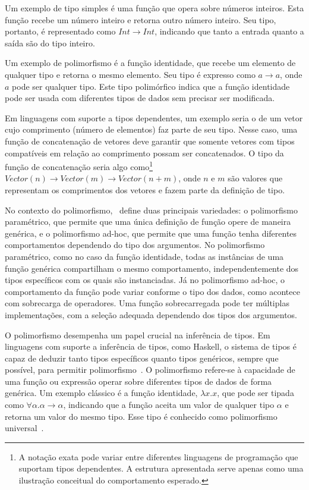 Um exemplo de tipo simples é uma função que opera sobre números inteiros.
Esta função recebe um número inteiro e retorna outro número inteiro.
Seu tipo, portanto, é representado como $Int \rightarrow Int$, indicando que tanto a entrada quanto a saída são do tipo inteiro.

Um exemplo de polimorfismo é a função identidade, que recebe um elemento de qualquer tipo e retorna o mesmo elemento.
Seu tipo é expresso como $a \rightarrow a$, onde $a$ pode ser qualquer tipo.
Este tipo polimórfico indica que a função identidade pode ser usada com diferentes tipos de dados sem precisar ser modificada.

Em linguagens com suporte a tipos dependentes, um exemplo seria o de um vetor cujo comprimento (número de elementos) faz parte de seu tipo.
Nesse caso, uma função de concatenação de vetores deve garantir que somente vetores com tipos compatíveis em relação ao comprimento possam ser concatenados.
O tipo da função de concatenação seria algo como\footnote{A notação exata pode variar entre diferentes linguagens de programação que suportam tipos dependentes. A estrutura apresentada serve apenas como uma ilustração conceitual do comportamento esperado.} $Vector(n) \rightarrow Vector(m) \rightarrow Vector(n+m)$, onde $n$ e $m$ são valores que representam os comprimentos dos vetores e fazem parte da definição de tipo.

No contexto do polimorfismo,~ define duas principais variedades: o polimorfismo paramétrico, que permite que uma única definição de função opere de maneira genérica, e o polimorfismo ad-hoc, que permite que uma função tenha diferentes comportamentos dependendo do tipo dos argumentos.
No polimorfismo paramétrico, como no caso da função identidade, todas as instâncias de uma função genérica compartilham o mesmo comportamento, independentemente dos tipos específicos com os quais são instanciadas.
Já no polimorfismo ad-hoc, o comportamento da função pode variar conforme o tipo dos dados, como acontece com sobrecarga de operadores. Uma função sobrecarregada pode ter múltiplas implementações, com a seleção adequada dependendo dos tipos dos argumentos.

O polimorfismo desempenha um papel crucial na inferência de tipos.
Em linguagens com suporte a inferência de tipos, como Haskell, o sistema de tipos é capaz de deduzir tanto tipos específicos quanto tipos genéricos, sempre que possível, para permitir polimorfismo~\cite{PIERCE2002}.
O polimorfismo refere-se à capacidade de uma função ou expressão operar sobre diferentes tipos de dados de forma genérica.
Um exemplo clássico é a função identidade, $\lambda x.x$, que pode ser tipada como $\forall \alpha. \alpha \to \alpha$, indicando que a função aceita um valor de qualquer tipo $\alpha$ e retorna um valor do mesmo tipo.
Esse tipo é conhecido como polimorfismo universal~\cite{PIERCE2002}.

